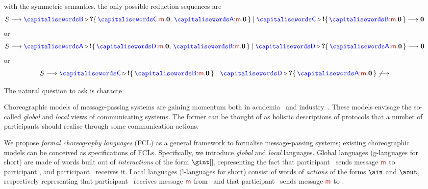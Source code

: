 with the symmetric semantics, 
the only possible reduction sequences are
$$
\aCS \longrightarrow
{\q}\triangleright  \text{\bf ?}\Set{\ptp[C]{:}\msg.\mathbf{0},\, \ptp[A]{:}\msg.\mathbf{0}}
\mid
{\ptp[C]}\triangleright  \text{\bf !}\Set{\ptp[B]{:}\msg.\mathbf{0}}
\longrightarrow
\mathbf{0}
$$
or
$$
\aCS \longrightarrow
{\p}\triangleright  \text{\bf !}\Set{\ptp[D]{:}\msg.\mathbf{0},\, \ptp[B]{:}\msg.\mathbf{0}}
\mid
{\ptp[D]}\triangleright  \text{\bf ?}\Set{\ptp[A]{:}\msg.\mathbf{0}}
\longrightarrow
\mathbf{0}
$$
or
$$
\aCS \longrightarrow
{\ptp[C]}\triangleright  \text{\bf !}\Set{\ptp[B]{:}\msg.\mathbf{0}}
\mid
{\ptp[D]}\triangleright  \text{\bf ?}\Set{\ptp[A]{:}\msg.\mathbf{0}}
\not\longrightarrow
$$



The natural question to ask is characte


























Choreographic models of message-passing systems are gaining momentum
both in academia~\cite{BasuB11,BravettiZ07,CarboneHY12} and
industry~\cite{WS-CDL,BPMN,boner18}.
% 
These models envisage the so-called \emph{global} and \emph{local}
views of communicating systems.
%
The former can be thought of as holistic descriptions of protocols
that a number of participants should realise through some
communication actions.
%

We propose \emph{formal choreography languages} (FCL) as a general
framework to formalise message-passing systems; existing choreographic
models can be conceived as specifications of FCLs.
% 
Specifically, we introduce \emph{global} and \emph{local} languages.
%
Global languages (g-languages for short) are made of words built out
of \emph{interactions} of the form $\gint[]$, representing the fact
that participant \p\ sends message $\msg$ to participant \q, and
participant \q\ receives it.
%
Local languages (l-languages for short) consist of words of
\emph{actions} of the forms $\ain$ and $\aout$,
respectively representing that participant \q\ receives message
$\msg$ from \p\ and that participant \p\ sends message $\msg$ to \q.

